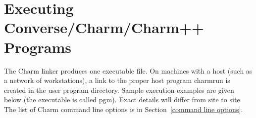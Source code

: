 %
%
%
%
%
%
%
%
%
%
%
%
%
%
%
%
%
%
%

\section[Executing Converse/Charm/Charm++ Programs]
	{Executing Converse/Charm/Charm++ Programs}
\label{executing charm programs}

The Charm linker produces one executable file.  On machines with a host
(such as a network of workstations), a link to the proper host program
{\fexec charmrun} is created in the user program directory.  Sample
execution examples are given below (the executable is called {\fparm
pgm}). Exact details will differ from site to site.  The list of Charm
command line options is in Section~\ref{command line options}.

